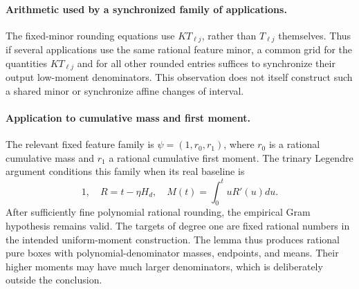 \documentclass[11pt]{article}
\begin{document}
\paragraph{Arithmetic used by a synchronized family of applications.}
The fixed-minor rounding equations use $K T_{\ell j}$, rather than
$T_{\ell j}$ themselves. Thus if several applications use the same
rational feature minor, a common grid for the quantities $K T_{\ell j}$
and for all other rounded entries suffices to synchronize their output
low-moment denominators. This observation does not itself construct
such a shared minor or synchronize affine changes of interval.

\paragraph{Application to cumulative mass and first moment.}
The relevant fixed feature family is $\psi=(1,r_0,r_1)$, where $r_0$
is a rational cumulative mass and $r_1$ a rational cumulative first
moment. The trinary Legendre argument conditions this family when its
real baseline is
\[
 1,\quad R=t-\eta H_d,\quad M(t)=\int_0^t uR'(u)du.
\]
After sufficiently fine polynomial rational rounding, the empirical
Gram hypothesis remains valid. The targets of degree one are fixed
rational numbers in the intended uniform-moment construction. The
lemma thus produces rational pure boxes with polynomial-denominator
masses, endpoints, and means. Their higher moments may have much
larger denominators, which is deliberately outside the conclusion.
\end{document}

